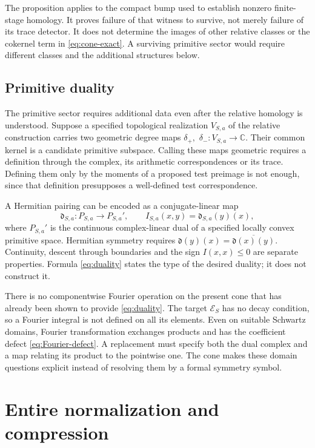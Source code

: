 \documentclass[11pt,letterpaper]{article}
\theoremstyle{definition}
\theoremstyle{remark}
\newcommand{\C}{\mathbb C}
\begin{document}
The proposition applies to the compact bump used to establish
nonzero finite-stage homology. It proves failure of that witness
to survive, not merely failure of its trace detector. It does not
determine the images of other relative classes or the cokernel
term in \eqref{eq:cone-exact}. A surviving primitive sector would
require different classes and the additional structures below.

\subsection{Primitive duality}

The primitive sector requires additional data even after the
relative homology is understood. Suppose a specified topological
realization $V_{S,a}$ of the relative construction carries two
geometric degree maps $\delta_+,$ $\delta_-:V_{S,a}\to\C$.
Their common kernel is a candidate primitive subspace. Calling
these maps geometric requires a definition through the complex,
its arithmetic correspondences or its trace. Defining them only
by the moments of a proposed test preimage is not enough, since
that definition presupposes a well-defined test correspondence.

A Hermitian pairing can be encoded as a conjugate-linear map
\begin{equation}
 \mathfrak d_{S,a}:P_{S,a}\longrightarrow P_{S,a}',\qquad
 I_{S,a}(x,y)=\mathfrak d_{S,a}(y)(x),
 \label{eq:duality}
\end{equation}
where $P_{S,a}'$ is the continuous complex-linear dual of a specified
locally convex primitive space. Hermitian symmetry requires
$\mathfrak d(y)(x)=\overline{\mathfrak d(x)(y)}$. Continuity,
descent through boundaries and the sign $I(x,x)\le0$ are separate
properties. Formula \eqref{eq:duality} states the type of the desired
duality; it does not construct it.

There is no componentwise Fourier operation on the present cone
that has already been shown to provide \eqref{eq:duality}.
The target $\mathscr E_S$ has no decay condition, so a Fourier
integral is not defined on all its elements. Even on suitable
Schwartz domains, Fourier transformation exchanges products and
has the coefficient defect \eqref{eq:Fourier-defect}. A replacement
must specify both the dual complex and a map relating its product
to the pointwise one. The cone makes these domain questions
explicit instead of resolving them by a formal symmetry symbol.

\section{Entire normalization and compression}
\end{document}
